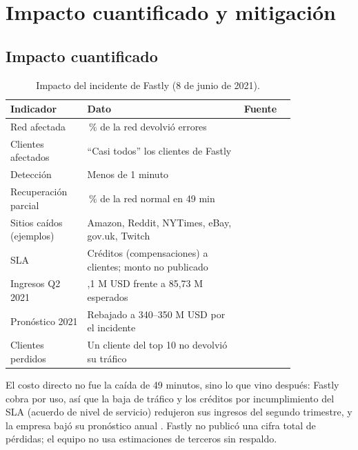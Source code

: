 
\section{Impacto cuantificado y mitigación}

\subsection*{Impacto cuantificado}

\begin{table}[h]
\centering
\small
\begin{tabular}{@{}>{\raggedright\arraybackslash}p{0.27\linewidth}>{\raggedright\arraybackslash}p{0.55\linewidth}l@{}}
\toprule
\textbf{Indicador} & \textbf{Dato} & \textbf{Fuente} \\
\midrule
Red afectada & 85\,\% de la red devolvió errores & \cite{fastly2021summary} \\
Clientes afectados & ``Casi todos'' los clientes de Fastly & \cite{fastly2021q2} \\
Detección & Menos de 1 minuto & \cite{fastly2021q2} \\
Recuperación parcial & 95\,\% de la red normal en 49 min & \cite{fastly2021summary} \\
Sitios caídos (ejemplos) & Amazon, Reddit, NYTimes, eBay, gov.uk, Twitch & \cite{medina2021thousandeyes,cnbc2021q2} \\
SLA & Créditos (compensaciones) a clientes; monto no publicado & \cite{fastly2021q2} \\
Ingresos Q2 2021 & 85,1 M USD frente a 85,73 M esperados & \cite{cnbc2021q2} \\
Pronóstico 2021 & Rebajado a 340--350 M USD por el incidente & \cite{fastly2021q2} \\
Clientes perdidos & Un cliente del top 10 no devolvió su tráfico & \cite{fastly2021q2} \\
\bottomrule
\end{tabular}
\caption{Impacto del incidente de Fastly (8 de junio de 2021).}
\end{table}

El costo directo no fue la caída de 49 minutos, sino lo que vino después: Fastly
cobra por uso, así que la baja de tráfico y los créditos por incumplimiento del
SLA (acuerdo de nivel de servicio) redujeron sus ingresos del segundo trimestre,
y la empresa bajó su pronóstico anual \cite{fastly2021q2}. Fastly no publicó una
cifra total de pérdidas; el equipo no usa estimaciones de terceros sin respaldo.

